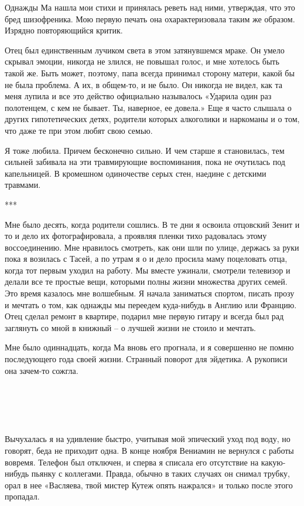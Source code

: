 \documentclass[
]{book}
\begin{document}
Однажды Ма нашла мои стихи и принялась реветь над ними, утверждая, что это бред шизофреника. Мою первую печать она охарактеризовала таким же образом. Изрядно повторяющийся критик.

Отец был единственным лучиком света в этом затянувшемся мраке. Он умело скрывал эмоции, никогда не злился, не повышал голос, и мне хотелось быть такой же. Быть может, поэтому, папа всегда принимал сторону матери, какой бы не была проблема. А их, в общем-то, и не было. Он никогда не видел, как та меня лупила и все это действо официально называлось «Ударила один раз полотенцем, с кем не бывает. Ты, наверное, ее довела.» Еще я часто слышала о других гипотетических детях, родители которых алкоголики и наркоманы и о том, что даже те при этом любят свою семью.

Я тоже любила. Причем бесконечно сильно. И чем старше я становилась, тем сильней забивала на эти травмирующие воспоминания, пока не очутилась под капельницей. В кромешном одиночестве серых стен, наедине с детскими травмами.

***

Мне было десять, когда родители сошлись. В те дни я освоила отцовский Зенит и то и дело их фотографировала, а проявляя пленки тихо радовалась этому воссоединению. Мне нравилось смотреть, как они шли по улице, держась за руки пока я возилась с Тасей, а по утрам я о и дело просила маму поцеловать отца, когда тот первым уходил на работу. Мы вместе ужинали, смотрели телевизор и делали все те простые вещи, которыми полны жизни множества других семей. Это время казалось мне волшебным. Я начала заниматься спортом, писать прозу и мечтать о том, как однажды мы переедем куда-нибудь в Англию или Францию. Отец сделал ремонт в квартире, подарил мне первую гитару и всегда был рад заглянуть со мной в книжный -- о лучшей жизни не стоило и мечтать.

Мне было одиннадцать, когда Ма вновь его прогнала, и я совершенно не помню последующего года своей жизни. Странный поворот для эйдетика. А рукописи она зачем-то сожгла.

\hypertarget{chapter-80}{%
\chapter{~}\label{chapter-80}}

Вычухалась я на удивление быстро, учитывая мой эпический уход под воду, но говорят, беда не приходит одна. В конце ноября Вениамин не вернулся с работы вовремя. Телефон был отключен, и сперва я списала его отсутствие на какую-нибудь пьянку с коллегами. Правда, обычно в таких случаях он снимал трубку, орал в нее «Васляева, твой мистер Кутеж опять нажрался» и только после этого пропадал.
\end{document}
